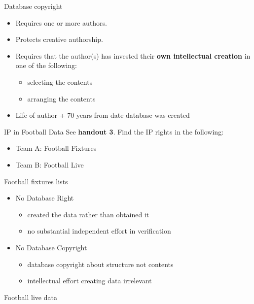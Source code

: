 \documentclass[aspectratio=169]{beamer}
\begin{document}
\begin{frame}{Database copyright}
  \begin{itemize}
  \item Requires one or more authors.
  \item Protects creative authorship.
  \item Requires that the author(s) has invested their {\bf own intellectual creation} in one of the following:
    \begin{itemize}
    \item selecting the contents
    \item arranging the contents
    \end{itemize}
  \item Life of  author + 70 years from date database was created
  \end{itemize}
\end{frame}

%

  \begin{frame}{IP in Football Data}
    See {\bf handout 3}. Find the IP rights in the following:
    \begin{itemize}
    \item Team A: Football Fixtures
    \item Team B: Football Live
    \end{itemize}
  \end{frame}


  \begin{frame}{Football fixtures lists}
      \begin{itemize}
      \item No Database Right
        \begin{itemize}
        \item created the data rather than obtained it
        \item no substantial independent effort in verification
        \end{itemize}
      \item No Database Copyright
        \begin{itemize}
        \item database copyright about structure not contents
        \item intellectual effort creating data irrelevant
        \end{itemize}
      \end{itemize}
  \end{frame}

  \begin{frame}{Football live data}
    
  \end{frame}
\end{document}
